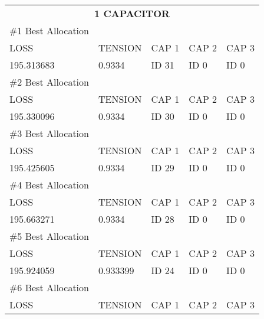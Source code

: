 \documentclass[12pt]{article}
\begin{document}
	
	\begin{table}[] 
		\centering
		\begin{tabular}{lllll} 
			\multicolumn{5}{c}{\textbf{1 CAPACITOR}}       \vspace{0.3cm} \\
			\#1 Best Allocation                    &          &       &       &       \\ \hline
			LOSS                                   & TENSION  & CAP 1 & CAP 2 & CAP 3 \\
			195.313683                             & 0.9334   & ID 31 & ID 0  & ID 0  \vspace{0.3cm} \\ 
			\#2 Best Allocation                    &          &       &       &       \\ \hline
			LOSS                                   & TENSION  & CAP 1 & CAP 2 & CAP 3 \\
			195.330096                             & 0.9334   & ID 30 & ID 0  & ID 0  \vspace{0.3cm} \\ 
			\#3 Best Allocation                    &          &       &       &       \\ \hline
			LOSS                                   & TENSION  & CAP 1 & CAP 2 & CAP 3 \\
			195.425605                             & 0.9334   & ID 29 & ID 0  & ID 0  \vspace{0.3cm} \\ 
			\#4 Best Allocation                    &          &       &       &       \\ \hline
			LOSS                                   & TENSION  & CAP 1 & CAP 2 & CAP 3 \\
			195.663271                             & 0.9334   & ID 28 & ID 0  & ID 0  \vspace{0.3cm} \\ 
			\#5 Best Allocation                    &          &       &       &       \\ \hline
			LOSS                                   & TENSION  & CAP 1 & CAP 2 & CAP 3 \\
			195.924059                             & 0.933399 & ID 24 & ID 0  & ID 0  \vspace{0.3cm} \\ 
			\#6 Best Allocation                    &          &       &       &       \\ \hline
			LOSS                                   & TENSION  & CAP 1 & CAP 2 & CAP 3 \\

\end{tabular}
\end{table}
\end{document}
